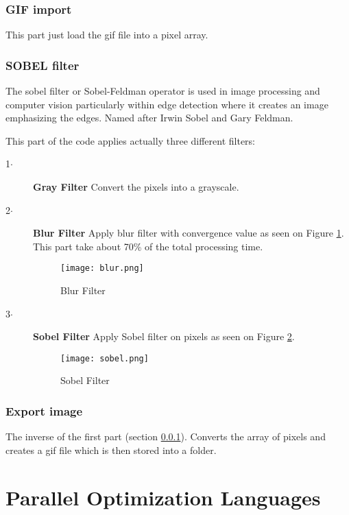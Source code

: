 \documentclass[conference,compsoc]{IEEEtran}
\begin{document}
\subsubsection{GIF import}\label{sec:GIF-import}
This part just load the gif file into a pixel array. 

\subsubsection{SOBEL filter}\label{sec:SOBEL-filter}
The sobel filter or Sobel-Feldman operator is used in image processing and computer vision particularly within edge detection where it creates an image emphasizing the edges. Named after Irwin Sobel and Gary Feldman.

This part of the code applies actually three different filters:
\begin{description}
	\item[1$\cdot$] \textbf{Gray Filter} Convert the pixels into a grayscale.
	\item[2$\cdot$] \textbf{Blur Filter} Apply blur filter with convergence value as seen on Figure \ref{fig:Blur-Filter}. This part take about 70\% of the total processing time.
	
	\begin{figure}[H]
		\texttt{[image: blur.png]}	\centering
		\caption{Blur Filter	\label{fig:Blur-Filter}}
	\end{figure}
	
	\item[3$\cdot$] \textbf{Sobel Filter} Apply Sobel filter on pixels as seen on Figure \ref{fig:Sobel-Filter}.
	
	\begin{figure}[H]
		\texttt{[image: sobel.png]}	\centering
		\caption{Sobel Filter	\label{fig:Sobel-Filter}}
	\end{figure}
	
\end{description}

\subsubsection{Export image}\label{sec:Export-image}
The inverse of the first part (section \ref{sec:GIF-import}). Converts the array of pixels and creates a gif file which is then stored into a folder.

\section{Parallel Optimization Languages}
\end{document}
